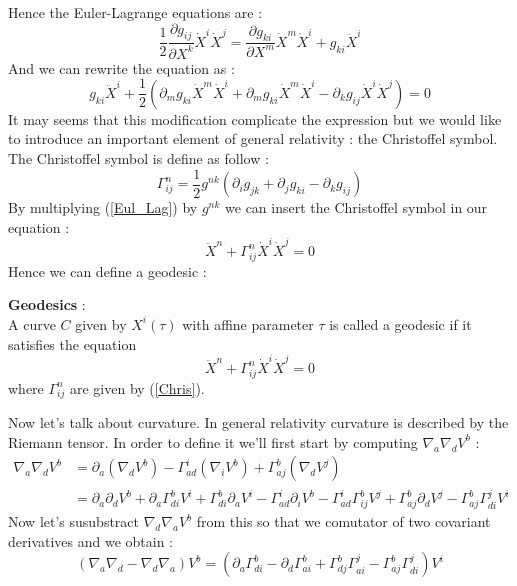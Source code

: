 \documentclass[a4paper,12pt]{article}
\theoremstyle{definition}
\begin{document}
Hence the Euler-Lagrange equations are :
\begin{equation*}
	\frac{1}{2}\frac{\partial g_{ij}}{\partial X^k}\dot{X}^i\dot{X}^j=
	\frac{\partial g_{ki}}{\partial X^m}\dot{X}^m\dot{X}^i+g_{ki}\ddot{X}^i
\end{equation*}
And we can rewrite the equation as :
\begin{equation}\label{Eul_Lag}
	g_{ki}\ddot{X}^i+\frac{1}{2}(\partial_m g_{ki}\dot{X}^m\dot{X}^i+\partial_m g_{ki}\dot{X}^m\dot{X}^i-\partial_k g_{ij}\dot{X}^i\dot{X}^j)=0
\end{equation}
It may seems that this modification complicate the expression but we would like to introduce an important element of general relativity : the Christoffel symbol.
The Christoffel symbol is define as follow :
\begin{equation}\label{Chris}
	\Gamma^n_{ij}=\frac{1}{2}g^{nk}(\partial_i g_{jk}+\partial_j g_{ki}-\partial_k g_{ij})
\end{equation}
By multiplying (\ref{Eul_Lag}) by $g^{nk}$ we can insert the Christoffel symbol in our equation :
\begin{equation*}
	\ddot{X}^n+\Gamma^n_{ij}\dot{X}^i\dot{X}^j=0
\end{equation*}
Hence we can define a geodesic :
\begin{definition}
	\textbf{Geodesics} :\\
	A curve $C$ given by $X^i(\tau)$ with affine parameter $\tau$ is called a geodesic if it satisfies the equation
	\begin{equation*}
		\ddot{X}^n+\Gamma^n_{ij}\dot{X}^i\dot{X}^j=0
	\end{equation*}
	where $\Gamma^n_{ij}$ are given by (\ref{Chris}).
\end{definition}
Now let's talk about curvature. In general relativity curvature is described by the Riemann tensor.
In order to define it we'll first start by computing $\nabla _a \nabla _d V^b$ :
\begin{align*}
	\nabla _a \nabla _d V^b &= \partial_a(\nabla _d V^b)-\Gamma^i_{ad} (\nabla _i V^b)+\Gamma^b_{aj} (\nabla _d V^j)\\
	&=\partial_a\partial_d V^b+ \partial_a \Gamma^b_{di}V^i+ \Gamma^b_{di}\partial_a V^i - \Gamma^i_{ad}\partial_i V^b
	-\Gamma^i_{ad}\Gamma^b_{ij}V^j+\Gamma^b_{aj}\partial_d V^j-\Gamma^b_{aj}\Gamma^j_{di}V^i
\end{align*}
Now let's susubstract $\nabla _d \nabla _a V^b$ from this so that we comutator of two covariant derivatives and we obtain :
\begin{equation*}
	(\nabla _a \nabla _d - \nabla _d \nabla _a)V^b=(\partial_a \Gamma^b_{di}-\partial_d \Gamma^b_{ai}+\Gamma^b_{dj}\Gamma^j_{ai}-\Gamma^b_{aj}\Gamma^j_{di})V^i
\end{equation*}
\end{document}
